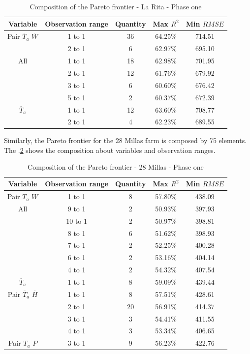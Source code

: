 \documentclass[review]{elsarticle}
\begin{document}
\begin{table}[h] 
\caption{Composition of the Pareto frontier - La Rita - Phase one} 
\label{tabla2} 
\centering
\begin{tabular}{c|c|c|c|c} 
\hline
\bfseries Variable & \bfseries Observation range & \bfseries Quantity & \bfseries Max $R^2$ & \bfseries Min $RMSE$\\ 
\hline\hline 
Pair $\overline{T}_{a}$ $\overline{W}$ &	1 to 1  & 36 & 64.25\% & 714.51 \\
 &	2 to 1  & 6 & 62.97\% & 695.10 \\
\hline 
All  & 1 to 1  & 18 & 62.98\% & 701.95 \\
   & 2 to 1  & 12 & 61.76\% & 679.92 \\
    & 3 to 1  & 6 & 60.60\% & 676.42 \\
    & 5 to 1  &  2 & 60.37\% & 672.39 \\
\hline    
$\overline{T}_{a}$ & 1 to 1  & 12  & 63.60\% & 708.77 \\
       &	2 to 1  & 4 & 62.23\% & 689.55 \\
\hline
\end{tabular} 
\end{table}

Similarly, the Pareto frontier for the 28 Millas farm is composed by 75 elements. The \tablename $.$\ref{tabla3} shows the composition about variables and observation ranges.

\begin{table}[h] 
\caption{Composition of the Pareto frontier - 28 Millas - Phase one} 
\label{tabla3} 
\centering
\begin{tabular}{c|c|c|c|c} 
\hline
\bfseries Variable & \bfseries Observation range & \bfseries Quantity & \bfseries Max $R^2$ & \bfseries Min $RMSE$\\ 
\hline\hline 
Pair $\overline{T}_{a}$ $\overline{W}$ & 1 to 1 & 8 & 57.80\% & 438.09 \\
\hline 
All   &	9 to 1 & 2 & 50.93\% & 397.93 \\
  & 10 to 1	 & 2 & 50.97\% & 398.81 \\
  &	8 to 1 & 6 & 51.62\% & 398.93 \\
  &	7 to 1 & 2 & 52.25\% & 400.28 \\
  &	6 to 1 & 2 & 53.16\% & 404.14 \\
  &	4 to 1 & 2 & 54.32\% & 407.54 \\
\hline    
$\overline{T}_{a}$ & 1 to 1  & 8  & 59.09\% & 439.44 \\
\hline
Pair $\overline{T}_{a}$ $\overline{H}$ & 1 to 1	 & 8 & 57.51\% & 428.61 \\
 &	2 to 1 & 20 & 56.91\% & 414.37 \\
 &	3 to 1 & 3 & 54.41\% & 411.55 \\
 &	4 to 1 & 3 & 53.34\% & 406.65 \\
\hline
Pair $\overline{T}_{a}$ $P$ & 3 to 1 & 9 & 56.23\% & 422.76 \\
\hline
\end{tabular} 
\end{table}
\end{document}
